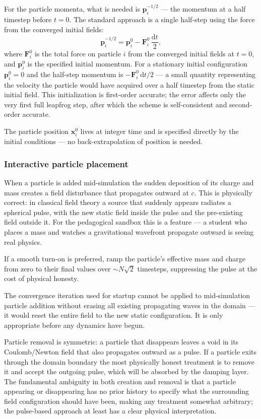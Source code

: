 \documentclass[11pt,a4paper]{article}
\newcommand{\vv}[1]{\mathbf{#1}}
\newcommand{\dd}{\mathrm{d}}
\begin{document}
For the particle momenta, what is needed is $\vv{p}_i^{-1/2}$ --- the momentum at a half timestep before $t=0$.  The standard approach is a single half-step using the force from the converged initial fields:
\begin{equation}
  \vv{p}_i^{-1/2} = \vv{p}_i^0 - \vv{F}_i^0\,\frac{\dd t}{2},
\end{equation}
where $\vv{F}_i^0$ is the total force on particle $i$ from the converged initial fields at $t=0$, and $\vv{p}_i^0$ is the specified initial momentum.  For a stationary initial configuration $\vv{p}_i^0 = 0$ and the half-step momentum is $-\vv{F}_i^0\,\dd t/2$ --- a small quantity representing the velocity the particle would have acquired over a half timestep from the static initial field.  This initialization is first-order accurate; the error affects only the very first full leapfrog step, after which the scheme is self-consistent and second-order accurate.

The particle position $\vv{x}_i^0$ lives at integer time and is specified directly by the initial conditions --- no back-extrapolation of position is needed.

\subsubsection*{Interactive particle placement}

When a particle is added mid-simulation the sudden deposition of its charge and mass creates a field disturbance that propagates outward at $c$.  This is physically correct: in classical field theory a source that suddenly appears radiates a spherical pulse, with the new static field inside the pulse and the pre-existing field outside it.  For the pedagogical sandbox this is a feature --- a student who places a mass and watches a gravitational wavefront propagate outward is seeing real physics.

If a smooth turn-on is preferred, ramp the particle's effective mass and charge from zero to their final values over $\sim N\sqrt{2}$ timesteps, suppressing the pulse at the cost of physical honesty.

The convergence iteration used for startup cannot be applied to mid-simulation particle addition without erasing all existing propagating waves in the domain --- it would reset the entire field to the new static configuration.  It is only appropriate before any dynamics have begun.

Particle removal is symmetric: a particle that disappears leaves a void in its Coulomb/Newton field that also propagates outward as a pulse.  If a particle exits through the domain boundary the most physically honest treatment is to remove it and accept the outgoing pulse, which will be absorbed by the damping layer.  The fundamental ambiguity in both creation and removal is that a particle appearing or disappearing has no prior history to specify what the surrounding field configuration should have been, making any treatment somewhat arbitrary; the pulse-based approach at least has a clear physical interpretation.
\end{document}
